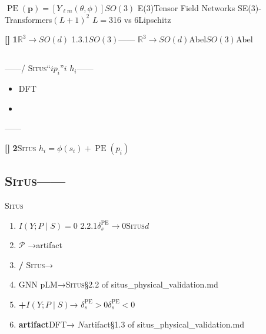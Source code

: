 \documentclass[11pt,a4paper]{article}
\theoremstyle{remark}
\DeclareMathOperator{\PE}{PE}
\newcommand{\R}{\mathbb{R}}
\newcommand{\Ppos}{\mathcal{P}}
\newcommand{\Situs}{\textsc{Situs}}
\newcommand{\openproblem}{\textnormal{\textbf{[]}}}
\begin{document}
\textbf{}
$\PE(\mathbf{p}) = [Y_{\ell m}(\theta, \phi)]$$SO(3)$
E(3)Tensor Field Networks\cite{thomas2018tfn}
SE(3)-Transformers\cite{fuchs2020se3}$(L+1)^2$
$L=3$16 vs 6Lipschitz

\openproblem{} \textbf{1}$\R^3 \to SO(d)$
1.3.1$SO(3)$——
$\R^3 \to SO(d)$Abel$SO(3)$Abel

\subsection{}

\textbf{}——/
\Situs{}``$i$$p_i$''$i$
$h_i$——


\begin{itemize}
    \item \textbf{}DFT
    \item \textbf{}
          
\end{itemize}

\textbf{}
——

\openproblem{} \textbf{2}\Situs{}
$h_i = \phi(s_i) + \PE(p_i)$

\subsection{\Situs{}——}

\Situs{}\textbf{}

\begin{enumerate}[label=(F\arabic*), leftmargin=*]
    \item \textbf{$I(Y; P \mid S) = 0$}
          2.2.1$\delta_s^{\PE} \to 0$\Situs{}$d$
    \item \textbf{}$\Ppos$
          →artifact
    \item \textbf{/}
          \Situs{}→
    \item \textbf{}GNN
          pLM→\Situs{}\S2.2 of
          situs\_physical\_validation.md
    \item \textbf{+}$I(Y; P \mid S)$→
          $\delta_s^{\PE} > 0$$\delta_s^{\PE} < 0$
    \item \textbf{artifact}DFT→
          $N$artifact\S1.3 of
          situs\_physical\_validation.md
\end{enumerate}

\subsection{}
\end{document}
